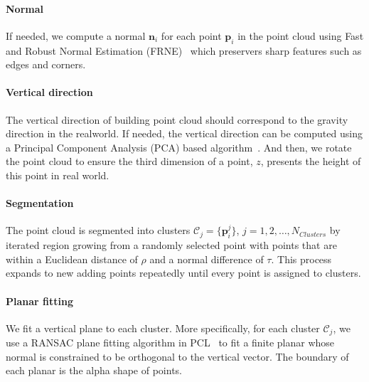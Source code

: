 \paragraph{Normal} If needed, we compute a normal $\mathbf{n}_i$ for each point $\mathbf{p}_i$ in the point cloud using Fast and Robust Normal Estimation (FRNE)~\cite{boulch2012fast} which preservers sharp features such as edges and corners.
%
\paragraph{Vertical direction} The vertical direction of building point cloud should correspond to the gravity direction in the realworld. If needed, the vertical direction can be computed using a Principal Component Analysis (PCA) based algorithm~\cite{KarlNiNicholasArmstrong-Crews2013}. And then, we rotate the point cloud to ensure the third dimension of a point, $z$, presents the height of this point in real world.
%
\paragraph{Segmentation} The point cloud is segmented into clusters $\mathcal{C}_j=\{\mathbf{p}^{j}_i\}$, $j=1,2,\ldots,N_{Clusters}$ by iterated region growing from a randomly selected point with points that are within a Euclidean distance of $\rho$ and a normal difference of $\tau$. This process expands to new adding points repeatedly until every point is assigned to clusters.
\paragraph{Planar fitting} We fit a vertical plane to each cluster. 
More specifically, for each cluster $\mathcal{C}_j$, we use a RANSAC plane fitting algorithm in PCL~\cite{} to fit a finite planar whose normal is constrained to be orthogonal to the vertical vector. The boundary of each planar is the alpha shape of points. 
